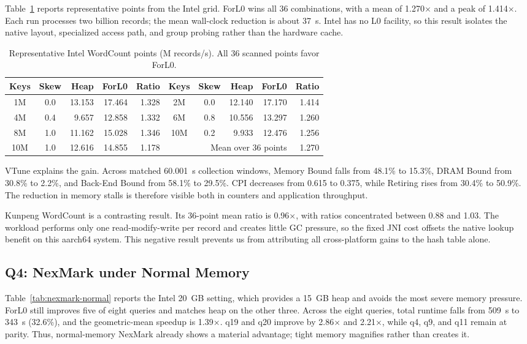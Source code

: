 \documentclass[sigconf]{acmart}
\newcommand{\forlzero}{ForL0\xspace}
\newcommand{\system}{\forlzero}
\begin{document}
Table~\ref{tab:wordcount} reports representative points from the Intel grid. \system wins all 36 combinations, with a mean of 1.270$\times$ and a peak of 1.414$\times$. Each run processes two billion records; the mean wall-clock reduction is about 37~s. Intel has no L0 facility, so this result isolates the native layout, specialized access path, and group probing rather than the hardware cache.

\begin{table}[t]
\caption{Representative Intel WordCount points (M records/s). All 36 scanned points favor \system.}
\label{tab:wordcount}
\centering
\small
\begin{tabular}{ccrrr@{\qquad}ccrrr}
\toprule
Keys & Skew & Heap & \system & Ratio & Keys & Skew & Heap & \system & Ratio \\
\midrule
1M & 0.0 & 13.153 & 17.464 & 1.328 & 2M & 0.0 & 12.140 & 17.170 & 1.414 \\
4M & 0.4 & 9.657 & 12.858 & 1.332 & 6M & 0.8 & 10.556 & 13.297 & 1.260 \\
8M & 1.0 & 11.162 & 15.028 & 1.346 & 10M & 0.2 & 9.933 & 12.476 & 1.256 \\
10M & 1.0 & 12.616 & 14.855 & 1.178 & \multicolumn{4}{r}{Mean over 36 points} & 1.270 \\
\bottomrule
\end{tabular}
\end{table}

VTune explains the gain. Across matched 60.001~s collection windows, Memory Bound falls from 48.1\% to 15.3\%, DRAM Bound from 30.8\% to 2.2\%, and Back-End Bound from 58.1\% to 29.5\%. CPI decreases from 0.615 to 0.375, while Retiring rises from 30.4\% to 50.9\%. The reduction in memory stalls is therefore visible both in counters and application throughput.

Kunpeng WordCount is a contrasting result. Its 36-point mean ratio is 0.96$\times$, with ratios concentrated between 0.88 and 1.03. The workload performs only one read-modify-write per record and creates little GC pressure, so the fixed JNI cost offsets the native lookup benefit on this aarch64 system. This negative result prevents us from attributing all cross-platform gains to the hash table alone.

\subsection{Q4: NexMark under Normal Memory}

Table~\ref{tab:nexmark-normal} reports the Intel 20~GB setting, which provides a 15~GB heap and avoids the most severe memory pressure. \system still improves five of eight queries and matches heap on the other three. Across the eight queries, total runtime falls from 509~s to 343~s (32.6\%), and the geometric-mean speedup is 1.39$\times$. q19 and q20 improve by 2.86$\times$ and 2.21$\times$, while q4, q9, and q11 remain at parity. Thus, normal-memory NexMark already shows a material advantage; tight memory magnifies rather than creates it.
\end{document}
